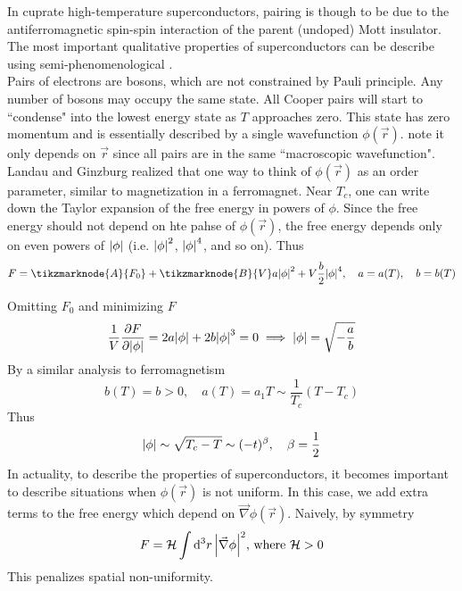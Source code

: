 \documentclass[12pt,a4paper,titlepage]{article}
\newcommand{\trm}[1]{\textrm{#1}} %
\newcommand{\ul}[1]{\underline{\smash{#1}}} %
\begin{document}
In cuprate high-temperature superconductors, pairing is though to be due to the antiferromagnetic spin-spin interaction of the parent (undoped) Mott insulator.\\

The most important qualitative properties of superconductors can be describe using semi-phenomenological \ul{Landau Ginzburg theory}.\\

Pairs of electrons are bosons, which are not constrained by Pauli principle. Any number of bosons may occupy the same state. All Cooper pairs will start to ``condense" into the lowest energy state as $T$ approaches zero. This state has zero momentum and is essentially described by a single wavefunction $\phi(\vec{r})$. note it only depends on $\vec{r}$ since all pairs are in the same ``macroscopic wavefunction". Landau and Ginzburg realized that one way to think of $\phi(\vec{r})$ as an order parameter, similar to magnetization in a ferromagnet. Near $T_{c}$, one can write down the Taylor expansion of the free energy in powers of $\phi$. Since the free energy should not depend on hte pahse of $\phi(\vec{r})$, the free energy depends only on even powers of $\abs{\phi}$ (i.e. $\abs{\phi}^{2}$, $\abs{\phi}^{4}$, and so on). Thus
\begin{equation}
F=\tikzmarknode{A}{F_{0}}+\tikzmarknode{B}{V}a\abs{\phi}^{2}+V\frac{b}{2}\abs{\phi}^{4},\quad a=a(T),\quad b=b(T)
\end{equation}
\vspace{1cm}

Omitting $F_{0}$ and minimizing $F$
\begin{equation}
\frac{1}{V}\pdv{F}{\abs{\phi}}=2a\abs{\phi}+2b\abs{\phi}^{3}=0\implies\abs{\phi}=\sqrt{-\frac{a}{b}}
\end{equation}
By a similar analysis to ferromagnetism
\begin{equation}
b(T)=b>0,\quad a(T)=a_{1}T\sim\frac{1}{T_{c}}(T-T_{c})
\end{equation}
Thus
\begin{equation}
\abs{\phi}\sim\sqrt{T_{c}-T}\sim(-t)^{\beta},\quad\beta=\frac{1}{2}
\end{equation}
In actuality, to describe the properties of superconductors, it becomes important to describe situations when $\phi(\vec{r})$ is not uniform. In this case, we add extra terms to the free energy which depend on $\vec{\nabla}\phi(\vec{r})$. Naively, by symmetry
\begin{equation}
F=\mathcal{H}\int\dd[3]{r}\abs{\vec{\nabla}\phi}^{2}\trm{, where $\mathcal{H}>0$}
\end{equation}
This penalizes spatial non-uniformity.\\
\end{document}
